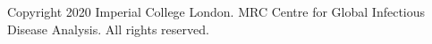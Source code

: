 Copyright\textsuperscript{\textcopyright} 2020 Imperial College London. MRC Centre for Global Infectious Disease Analysis. All rights reserved.
